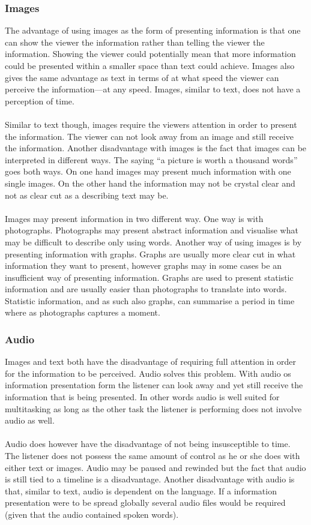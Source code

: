 \subsubsection{Images}
The advantage of using images as the form of presenting information is that one can show the viewer the information rather than telling the viewer the information. Showing the viewer could potentially mean that more information could be presented within a smaller space than text could achieve. Images also gives the same advantage as text in terms of at what speed the viewer can perceive the information---at any speed. Images, similar to text, does not have a perception of time.
\\
\\
Similar to text though, images require the viewers attention in order to present the information. The viewer can not look away from an image and still receive the information. Another disadvantage with images is the fact that images can be interpreted in different ways. The saying ``a picture is worth a thousand words'' goes both ways. On one hand images may present much information with one single images. On the other hand the information may not be crystal clear and not as clear cut as a describing text may be.
\\
\\
Images may present information in two different way. One way is with photographs. Photographs may present abstract information and visualise what may be difficult to describe only using words. Another way of using images is by presenting information with graphs. Graphs are usually more clear cut in what information they want to present, however graphs may in some cases be an insufficient way of presenting information. Graphs are used to present statistic information and are usually easier than photographs to translate into words. Statistic information, and as such also graphs, can summarise a period in time where as photographs captures a moment. 

\subsubsection{Audio}
Images and text both have the disadvantage of requiring full attention in order for the information to be perceived. Audio solves this problem. With audio os information presentation form the listener can look away and yet still receive the information that is being presented. In other words audio is well suited for multitasking as long as the other task the listener is performing does not involve audio as well.
\\
\\
Audio does however have the disadvantage of not being insusceptible to time. The listener does not possess the same amount of control as he or she does with either text or images. Audio may be paused and rewinded but the fact that audio is still tied to a timeline is a disadvantage. Another disadvantage with audio is that, similar to text, audio is dependent on the language. If a information presentation were to be spread globally several audio files would be required (given that the audio contained spoken words).

